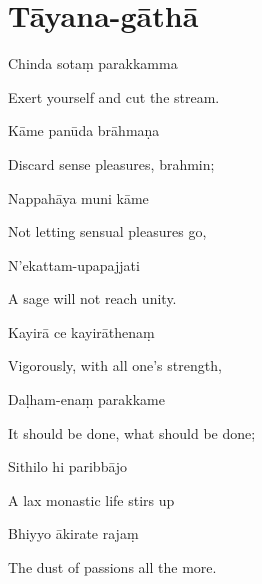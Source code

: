
\section{Tāyana-gāthā}


\begin{leader}
\end{leader}

\smallskip


Chinda sotaṃ parakkamma

\begin{english}
  Exert yourself and cut the stream.
\end{english}

Kāme panūda brāhmaṇa

\begin{english}
  Discard sense pleasures, brahmin;
\end{english}

Nappahāya muni kāme

\begin{english}
  Not letting sensual pleasures go,
\end{english}

N'ekattam-upapajjati

\begin{english}
  A sage will not reach unity.
\end{english}

Kayirā ce kayirāthenaṃ

\begin{english}
  Vigorously, with all one's strength,
\end{english}

Daḷham-enaṃ parakkame

\begin{english}
  It should be done, what should be done;
\end{english}

Sithilo hi paribbājo

\begin{english}
  A lax monastic life stirs up
\end{english}

Bhiyyo ākirate rajaṃ

\begin{english}
  The dust of passions all the more.
\end{english}

